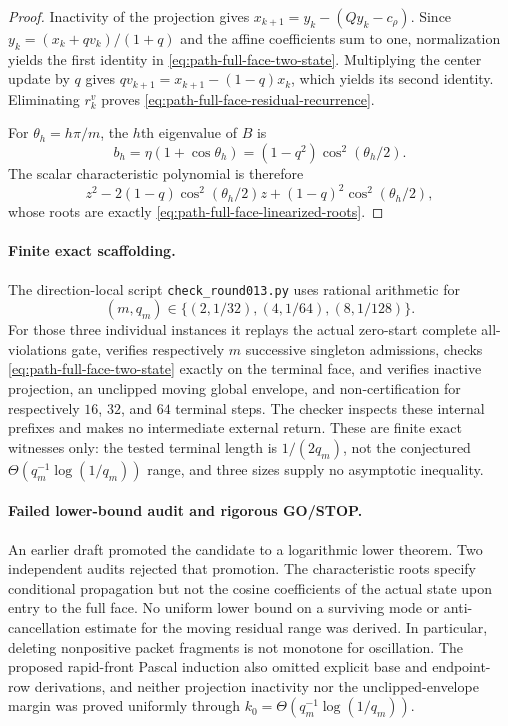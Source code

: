 \begin{proof}
Inactivity of the projection gives
$x_{k+1}=y_k-(Qy_k-c_\rho)$.  Since
$y_k=(x_k+qv_k)/(1+q)$ and the affine coefficients sum to one,
normalization yields the first identity in
\cref{eq:path-full-face-two-state}.  Multiplying the center update by $q$
gives $qv_{k+1}=x_{k+1}-(1-q)x_k$, which yields its second identity.
Eliminating $r_k^v$ proves
\cref{eq:path-full-face-residual-recurrence}.

For $\theta_h=h\pi/m$, the $h$th eigenvalue of $B$ is
\[
 b_h=\eta(1+\cos\theta_h)
     =(1-q^2)\cos^2(\theta_h/2).
\]
The scalar characteristic polynomial is therefore
\[
 z^2-2(1-q)\cos^2(\theta_h/2)z
 +(1-q)^2\cos^2(\theta_h/2),
\]
whose roots are exactly
\cref{eq:path-full-face-linearized-roots}.
\end{proof}

\paragraph{Finite exact scaffolding.}
The direction-local script \texttt{check\_round013.py} uses rational
arithmetic for
\[
 (m,q_m)\in\{(2,1/32),(4,1/64),(8,1/128)\}.
\]
For those three individual instances it replays the actual zero-start
complete all-violations gate, verifies respectively $m$ successive singleton
admissions, checks \cref{eq:path-full-face-two-state} exactly on the terminal
face, and verifies inactive projection, an unclipped moving global envelope,
and non-certification for respectively $16$, $32$, and $64$ terminal steps.
The checker inspects these internal prefixes and makes no intermediate
external return.  These are finite exact witnesses only: the tested terminal
length is $1/(2q_m)$, not the conjectured
$\Theta(q_m^{-1}\log(1/q_m))$ range, and three sizes supply no asymptotic
inequality.

\paragraph{Failed lower-bound audit and rigorous GO/STOP.}
An earlier draft promoted the candidate to a logarithmic lower theorem.  Two
independent audits rejected that promotion.  The characteristic roots specify
conditional propagation but not the cosine coefficients of the actual state
upon entry to the full face.  No uniform lower bound on a surviving mode or
anti-cancellation estimate for the moving residual range was derived.
In particular, deleting nonpositive packet fragments is not monotone for
oscillation.  The proposed rapid-front Pascal induction also omitted explicit
base and endpoint-row derivations, and neither projection inactivity nor the
unclipped-envelope margin was proved uniformly through
$k_0=\Theta(q_m^{-1}\log(1/q_m))$.

